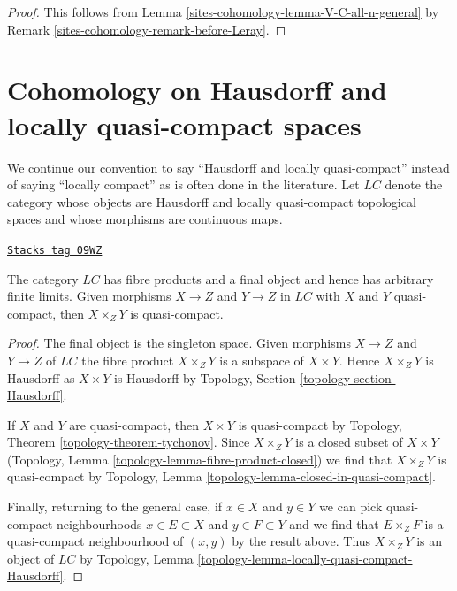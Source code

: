 \begin{proof}
This follows from Lemma \ref{sites-cohomology-lemma-V-C-all-n-general}
by Remark \ref{sites-cohomology-remark-before-Leray}.
\end{proof}

\section{Cohomology on Hausdorff and locally quasi-compact spaces}
\label{sites-cohomology-section-cohomology-LC}
We continue our convention to say ``Hausdorff and locally quasi-compact''
instead of saying ``locally compact'' as is often done in the literature.
Let $\textit{LC}$ denote the category whose objects are Hausdorff and
locally quasi-compact topological spaces and whose morphisms are continuous
maps.

\begin{lemma}[LC basic]
\label{sites-cohomology-lemma-LC-basic}
\href{https://stacks.math.columbia.edu/tag/09WZ}{\texttt{Stacks tag 09WZ}}

The category $\textit{LC}$ has fibre products and a final object and hence
has arbitrary finite limits. Given morphisms $X \to Z$ and $Y \to Z$
in $\textit{LC}$ with
$X$ and $Y$ quasi-compact, then $X \times_Z Y$ is quasi-compact.
\end{lemma}

\begin{proof}
The final object is the singleton space. Given morphisms $X \to Z$ and
$Y \to Z$ of $\textit{LC}$ the fibre product $X \times_Z Y$ is
a subspace of $X \times Y$. Hence $X \times_Z Y$ is Hausdorff as
$X \times Y$ is Hausdorff by
Topology, Section \ref{topology-section-Hausdorff}.

\medskip\noindent
If $X$ and $Y$ are quasi-compact, then $X \times Y$ is quasi-compact by
Topology, Theorem \ref{topology-theorem-tychonov}.
Since $X \times_Z Y$ is a closed subset of $X \times Y$
(Topology, Lemma \ref{topology-lemma-fibre-product-closed})
we find that $X \times_Z Y$ is quasi-compact by
Topology, Lemma \ref{topology-lemma-closed-in-quasi-compact}.

\medskip\noindent
Finally, returning to the general case, if $x \in X$ and $y \in Y$
we can pick quasi-compact neighbourhoods $x \in E \subset X$ and
$y \in F \subset Y$ and we find that $E \times_Z F$ is a quasi-compact
neighbourhood of $(x, y)$ by the result above. Thus $X \times_Z Y$
is an object of $\textit{LC}$ by
Topology, Lemma \ref{topology-lemma-locally-quasi-compact-Hausdorff}.
\end{proof}

